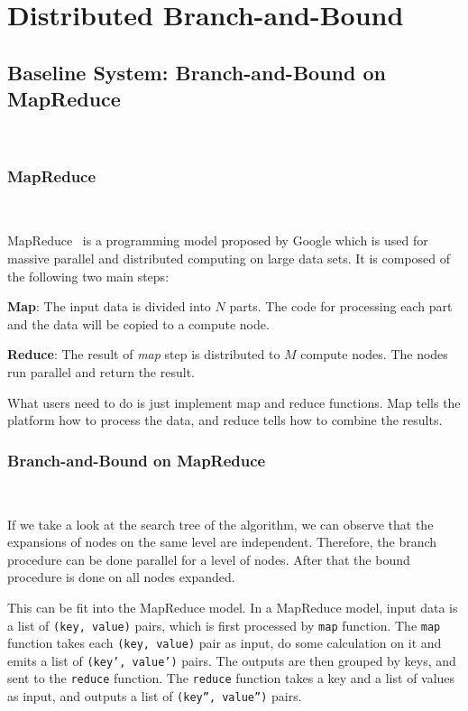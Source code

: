 \section{Distributed Branch-and-Bound}

\subsection{Baseline System: Branch-and-Bound on MapReduce}\

\subsubsection{MapReduce}\

\noindent MapReduce~\cite{} is a programming model proposed by Google which is used for massive parallel and distributed computing on large data sets. It is composed of the following two main steps:

\noindent \textbf{Map}: The input data is divided into $N$ parts. The code for processing each part and the data will be copied to a compute node.

\noindent \textbf{Reduce}: The result of \textit{map} step is distributed to $M$ compute nodes. The nodes run parallel and return the result.

What users need to do is just implement map and reduce functions. Map tells the platform how to process the data, and reduce tells how to combine the results.


\subsubsection{Branch-and-Bound on MapReduce}\

\noindent If we take a look at the search tree of the algorithm, we can observe that the expansions of nodes on the same level are independent. Therefore, the branch procedure can be done parallel for a level of nodes. After that the bound procedure is done on all nodes expanded.

This can be fit into the MapReduce model. In a MapReduce model, input data is a list of \texttt{(key, value)} pairs, which is first processed by \texttt{map} function. The \texttt{map} function takes each \texttt{(key, value)} pair as input, do some calculation on it and emits a list of \texttt{(key', value')} pairs. The outputs are then grouped by keys, and sent to the \texttt{reduce} function. The \texttt{reduce} function takes a key and a list of values as input, and outputs a list of \texttt{(key'', value'')} pairs.

